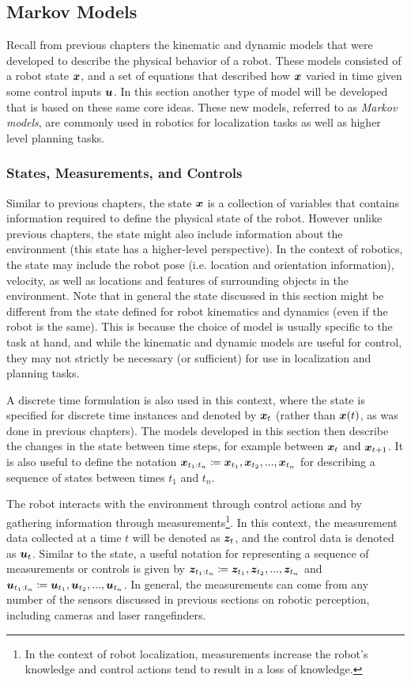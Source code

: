 \subsection{Markov Models}
Recall from previous chapters the kinematic and dynamic models that were developed to describe the physical behavior of a robot. These models consisted of a robot state $\bm{x}$, and a set of equations that described how $\bm{x}$ varied in time given some control inputs $\bm{u}$. In this section another type of model will be developed that is based on these same core ideas. These new models, referred to as \textit{Markov models}, are commonly used in robotics for localization tasks as well as higher level planning tasks.

\subsubsection{States, Measurements, and Controls}
Similar to previous chapters, the state $\bm{x}$ is a collection of variables that contains information required to define the physical state of the robot. However unlike previous chapters, the state might also include information about the environment (this state has a higher-level perspective). In the context of robotics, the state may include the robot pose (i.e. location and orientation information), velocity, as well as locations and features of surrounding objects in the environment. 
Note that in general the state discussed in this section might be different from the state defined for robot kinematics and dynamics (even if the robot is the same). This is because the choice of model is usually specific to the task at hand, and while the kinematic and dynamic models are useful for control, they may not strictly be necessary (or sufficient) for use in localization and planning tasks.

A discrete time formulation is also used in this context, where the state is specified for discrete time instances and denoted by $\bm{x}_t$ (rather than $\bm{x}(t)$, as was done in previous chapters). The models developed in this section then describe the changes in the state between time steps, for example between $\bm{x}_t$ and $\bm{x}_{t+1}$. It is also useful to define the notation $\bm{x}_{t_1:t_n} \coloneqq \bm{x}_{t_1},\bm{x}_{t_2},...,\bm{x}_{t_n}$ for describing a sequence of states between times $t_1$ and $t_n$.

The robot interacts with the environment through control actions and by gathering information through measurements\footnote{In the context of robot localization, measurements increase the robot's knowledge and control actions tend to result in a loss of knowledge.}. In this context, the measurement data collected at a time $t$ will be denoted as $\bm{z}_t$, and the control data is denoted as $\bm{u}_t$. Similar to the state, a useful notation for representing a sequence of measurements or controls is given by  $\bm{z}_{t_1:t_n} \coloneqq \bm{z}_{t_1},\bm{z}_{t_2},...,\bm{z}_{t_n}$ and $\bm{u}_{t_1:t_n} \coloneqq \bm{u}_{t_1},\bm{u}_{t_2},...,\bm{u}_{t_n}$. In general, the measurements can come from any number of the sensors discussed in previous sections on robotic perception, including cameras and laser rangefinders.

